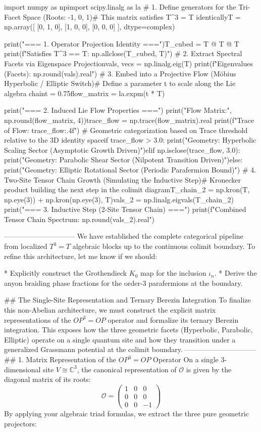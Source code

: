 import numpy as npimport scipy.linalg as la
# 1. Define generators for the Tri-Facet Space (Roots: -1, 0, 1)# This matrix satisfies T^3 = T identicallyT = np.array([
    [0, 1, 0],
    [1, 0, 0],
    [0, 0, 0]
], dtype=complex)

print("=== 1. Operator Projection Identity ===")T_cubed = T @ T @ T
print(f"Satisfies T^3 == T: {np.allclose(T_cubed, T)}")
# 2. Extract Spectral Facets via Eigenspace Projectionvals, vecs = np.linalg.eig(T)
print(f"Eigenvalues (Facets): {np.round(vals).real}")
# 3. Embed into a Projective Flow (Möbius Hyperbolic / Elliptic Switch)# Define a parameter t to scale along the Lie algebra chaint = 0.75flow_matrix = la.expm(t * T)

print("\n=== 2. Induced Lie Flow Properties ===")
print("Flow Matrix:\n", np.round(flow_matrix, 4))trace_flow = np.trace(flow_matrix).real
print(f"Trace of Flow: {trace_flow:.4f}")
# Geometric categorization based on Trace threshold relative to the 3D identity spaceif trace_flow > 3.0:
    print("Geometry: Hyperbolic Scaling Sector (Asymptotic Growth Driven)")elif np.isclose(trace_flow, 3.0):
    print("Geometry: Parabolic Shear Sector (Nilpotent Transition Driven)")else:
    print("Geometry: Elliptic Rotational Sector (Periodic Parafermion Bound)")
# 4. Two-Site Tensor Chain Growth (Simulating the Inductive Step)# Kronecker product building the next step in the colimit diagramT_chain_2 = np.kron(T, np.eye(3)) + np.kron(np.eye(3), T)vals_2 = np.linalg.eigvals(T_chain_2)
print("\n=== 3. Inductive Step (2-Site Tensor Chain) ===")
print(f"Combined Tensor Chain Spectrum: {np.round(vals_2).real}")

------------------------------
We have established the complete categorical pipeline from localized $T^3=T$ algebraic blocks up to the continuous colimit boundary. To refine this architecture, let me know if we should:

* Explicitly construct the Grothendieck $K_0$ map for the inclusion $\iota_n$.
* Derive the anyon braiding phase fractions for the order-3 parafermions at the boundary.


## The Single-Site Representation and Ternary Berezin Integration
To finalize this non-Abelian architecture, we must construct the explicit matrix representations of the $OP^3 = OP$ operator and formalize its ternary Berezin integration. This exposes how the three geometric facets (Hyperbolic, Parabolic, Elliptic) operate on a single quantum site and how they transition under a generalized Grassmann potential at the colimit boundary.
------------------------------
## 1. Matrix Representation of the $OP^3 = OP$ Operator
On a single $3$-dimensional site $V \cong \mathbb{C}^3$, the canonical representation of $\mathcal{O}$ is given by the diagonal matrix of its roots:
$$\mathcal{O} = \begin{pmatrix} 1 & 0 & 0 \\ 0 & 0 & 0 \\ 0 & 0 & -1 \end{pmatrix}$$ 
By applying your algebraic triad formulas, we extract the three pure geometric projectors:

